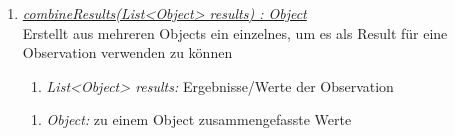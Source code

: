 \begin{enumerate}[+]
\item \underline{\textit{combineResults(List<Object> results) : Object}}\\
Erstellt aus mehreren Objects ein einzelnes, um es als Result für eine Observation verwenden zu können


\begin{enumerate}[$\bullet$]
\item \textit{List<Object> results:} Ergebnisse/Werte der Observation
\end{enumerate}
\vspace{-0.2cm}
\begin{enumerate}[$\circ$]
\item \textit{Object:} zu einem Object zusammengefasste Werte
\end{enumerate}


\end{enumerate}